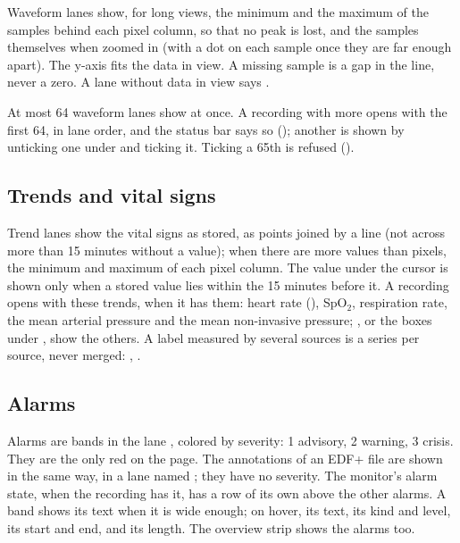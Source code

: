 Waveform lanes show, for long views, the minimum and the maximum of the samples behind each
pixel column, so that no peak is lost, and the samples themselves when zoomed in (with a dot on
each sample once they are far enough apart). The y-axis fits the data in view. A missing sample
is a gap in the line, never a zero. A lane without data in view says .

At most 64 waveform lanes show at once. A recording with more opens with the first 64, in lane
order, and the status bar says so (); another is shown by unticking one under  and ticking it. Ticking a
65th is refused ().

\subsection{Trends and vital signs}
\label{sec:vitalstream-trends}

Trend lanes show the vital signs as stored, as points joined by a line (not across more than 15
minutes without a value); when there are more values than pixels, the minimum and maximum of
each pixel column. The value under the cursor is shown only when a stored value lies within the
15 minutes before it. A recording opens with these trends, when it has them: heart rate (),
SpO$_2$, respiration rate, the mean arterial pressure and the mean non-invasive pressure;
, or the boxes under , show the others. A label
measured by several sources is a series per source, never merged: , .

\subsection{Alarms}
\label{sec:vitalstream-alarms}

Alarms are bands in the lane , colored by severity: 1 advisory, 2 warning, 3 crisis.
They are the only red on the page. The annotations of an EDF+ file are shown in the same way, in
a lane named ; they have no severity. The monitor's alarm state, when the recording has it, has a row
of its own above the other alarms. A band shows its text when it is wide enough; on hover, its
text, its kind and level, its start and end, and its length. The overview strip shows the alarms
too.

